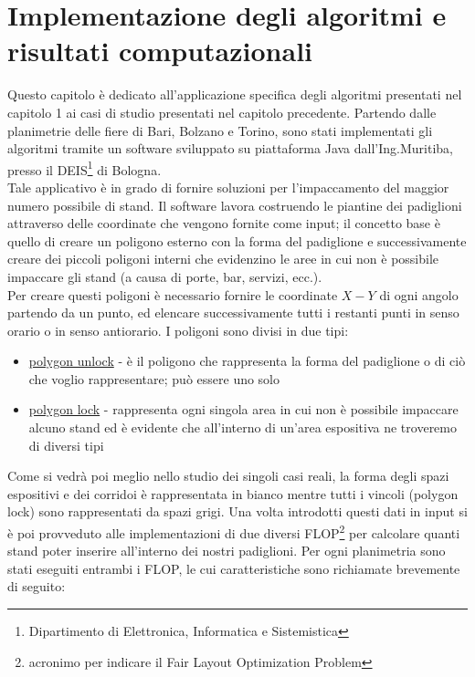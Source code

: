 \documentclass[12pt,a4paper,openright,twoside]{report}
\begin{document}
\chapter{Implementazione degli algoritmi e risultati computazionali}                   %
Questo capitolo \`{e} dedicato all'applicazione specifica degli algoritmi presentati nel capitolo 1 ai casi di studio presentati nel capitolo precedente. Partendo dalle planimetrie delle fiere di Bari, Bolzano e Torino, sono stati implementati gli algoritmi tramite un software sviluppato su piattaforma Java dall'Ing.Muritiba, presso il DEIS\footnote{Dipartimento di Elettronica, Informatica e Sistemistica} di Bologna. \\Tale applicativo \`{e} in grado di fornire soluzioni per l'impaccamento del maggior numero possibile di stand. Il software lavora costruendo le piantine dei padiglioni attraverso delle coordinate che vengono fornite come input; il concetto base \`{e} quello di creare un poligono esterno con la forma del padiglione e successivamente creare dei piccoli poligoni interni che evidenzino le aree in cui non \`{e} possibile impaccare gli stand (a causa di porte, bar, servizi, ecc.).
\\Per creare questi poligoni \`{e} necessario fornire le coordinate $X-Y$ di ogni angolo partendo da un punto, ed elencare successivamente tutti i restanti punti in senso orario o in senso antiorario. I poligoni sono divisi in due tipi:
\begin{itemize}
\item \underline{polygon unlock} - \`{e} il poligono che rappresenta la forma del padiglione o di ci\`{o} che voglio rappresentare; pu\`{o} essere uno solo
\item \underline{polygon lock} - rappresenta ogni singola area in cui non \`{e} possibile impaccare alcuno stand ed \`{e} evidente che all'interno di un'area espositiva ne troveremo di diversi tipi
\end{itemize}
Come si vedr\`{a} poi meglio nello studio dei singoli casi reali, la forma degli spazi espositivi e dei corridoi \`{e} rappresentata in bianco mentre tutti i vincoli (polygon lock) sono rappresentati da spazi grigi.
Una volta introdotti questi dati in input si \`{e} poi provveduto alle implementazioni di due diversi FLOP\footnote{acronimo per indicare il Fair Layout Optimization Problem} per calcolare quanti stand poter inserire all'interno dei nostri padiglioni.  
Per ogni planimetria sono stati eseguiti entrambi i FLOP, le cui caratteristiche sono richiamate brevemente di seguito:
\end{document}
